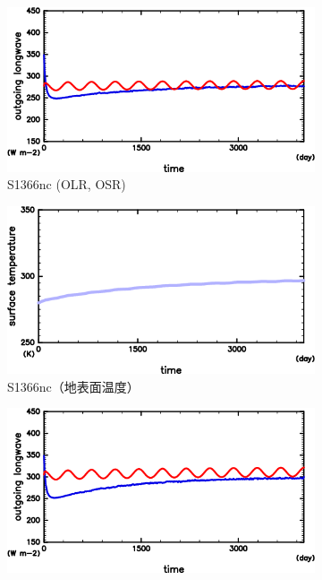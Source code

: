\documentclass[body]{subfiles}
\begin{document}
\begin{figure}[t]
	\centering
	\begin{subfigure}{.4\textwidth}
		\centering
		\includegraphics[width=\columnwidth]{S1366-nc/S1366nc_OLRA-OSRA_horimean_time0.0-4015.0-crop.png}
		\caption{S1366nc (OLR, OSR)}\label{S1366nc_OLRA}
	\end{subfigure}
	\begin{subfigure}{.4\textwidth}
		\centering
		\includegraphics[width=\columnwidth]{S1366-nc/S1366nc_SurfTemp_horimean_time0.0-4015.0-crop.png}
		\caption{S1366nc（地表面温度）}\label{S1366nc_SurfTemp}
	\end{subfigure}
	\begin{subfigure}{.4\textwidth}
		\centering
		\includegraphics[width=\columnwidth]{S1500-nc/S1500nc_OLRA-OSRA_horimean_time0.0-4015.0-crop.png}

\end{subfigure}
\end{figure}
\end{document}
